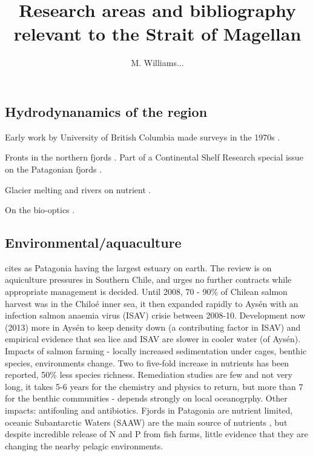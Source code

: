 \documentclass[11pt, oneside]{article}   	%
\title{Research areas and bibliography relevant to the Strait of Magellan}
\author{M. Williams...}
\begin{document}
\maketitle

\subsection{Hydrodynanamics of the region} 

Early work by University of British Columbia made surveys in the 1970s \citep{pickard71}.

Fronts in the northern fjords \citep{calvete11}. Part of a Continental Shelf Research special issue on the Patagonian fjords \cite{pantoja11}.

Glacier melting and rivers on nutrient \citep{vargas18}.

On the bio-optics \citep{lutz16}.

\subsection{Environmental/aquaculture}

\citep{niklitschek13} cites \citet{iriarte10} as Patagonia having the largest estuary on earth. The \citet{niklitschek13} review is on aquiculture pressures in Southern Chile, and urges no further contracts while appropriate management is decided. Until 2008, 70 - 90\% of Chilean salmon harvest was in the Chilo{\'e} inner sea, it then expanded rapidly to  Ays{\'e}n with an infection salmon anaemia virus (ISAV) crisie between 2008-10. Development now (2013) more in Ays{\'e}n to keep density down (a contributing factor in ISAV) and empirical evidence that sea lice and ISAV are slower in cooler water (of Ays{\'e}n). Impacts of salmon farming - locally increased sedimentation under cages, benthic species, environments change. Two to five-fold increase in nutrients has been reported, 50\% less species richness. Remediation studies are few and not very long, it takes 5-6 years for the chemistry and physics to return, but more than 7 for the benthic communities - depends strongly on local oceanogrphy. Other impacts: antifouling and antibiotics. Fjords in Patagonia are nutrient limited, oceanic Subantarctic Waters (SAAW) are the main source of nutrients \citep{iriarte10}, but despite incredible release of N and P from fish farms, little evidence that they are changing the nearby pelagic environments. 
\end{document}
